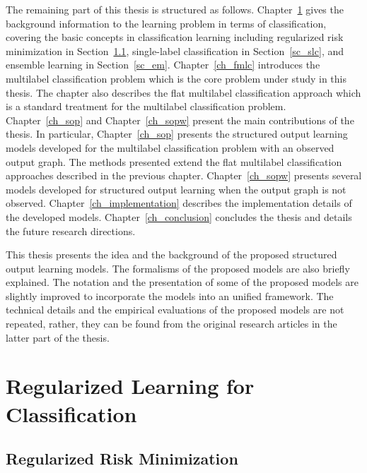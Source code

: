 The remaining part of this thesis is structured as follows.
Chapter~\ref{ch_rlc} gives the background information to the learning problem in terms of classification, covering the basic concepts in classification learning including regularized risk minimization in Section~\ref{sc_rrm}, single-label classification in Section~\ref{sc_slc}, and ensemble learning in Section~\ref{sc_em}.
Chapter~\ref{ch_fmlc} introduces the multilabel classification problem which is the core problem under study in this thesis.
The chapter also describes the flat multilabel classification approach which is a standard treatment for the multilabel classification problem.
Chapter~\ref{ch_sop} and Chapter~\ref{ch_sopw} present the main contributions of the thesis.
In particular, Chapter~\ref{ch_sop} presents the structured output learning models developed for the multilabel classification problem with an observed output graph.
The methods presented extend the flat multilabel classification approaches described in the previous chapter.
Chapter~\ref{ch_sopw} presents several models developed for structured output learning when the output graph is not observed.
Chapter~\ref{ch_implementation} describes the implementation details of the developed models.
Chapter~\ref{ch_conclusion} concludes the thesis and details the future research directions.

This thesis presents the idea and the background of the proposed structured output learning models.
The formalisms of the proposed models are also briefly explained.
The notation and the presentation of some of the proposed models are slightly improved to incorporate the models into an unified framework.
The technical details and the empirical evaluations of the proposed models are not repeated, rather, they can be found from the original research articles in the latter part of the thesis.



%
%
%
\chapter{Regularized Learning for Classification} \label{ch_rlc}



%
\section{Regularized Risk Minimization}\label{sc_rrm}

